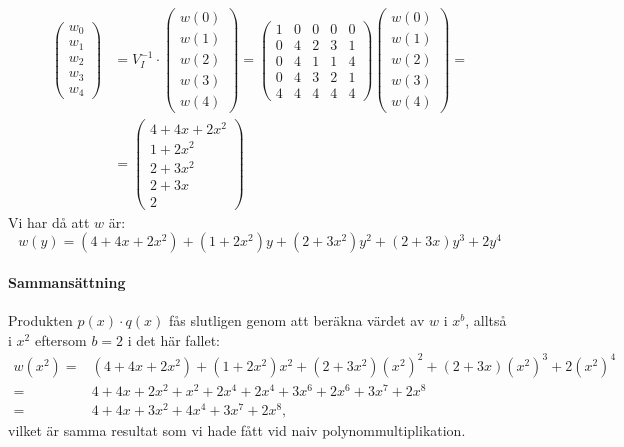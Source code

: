 \begin{align*}
  \begin{pmatrix}
    w_0 \\
    w_1 \\
    w_2 \\
    w_3 \\
    w_4
  \end{pmatrix} & =
  V_I^{-1} \cdot \begin{pmatrix}
    w(0) \\
    w(1) \\
    w(2) \\
    w(3) \\
    w(4)
  \end{pmatrix} =
  \begin{pmatrix}
    1 & 0 & 0 & 0 & 0 \\
    0 & 4 & 2 & 3 & 1 \\
    0 & 4 & 1 & 1 & 4 \\
    0 & 4 & 3 & 2 & 1 \\
    4 & 4 & 4 & 4 & 4
  \end{pmatrix}
  \begin{pmatrix}
    w(0) \\
    w(1) \\
    w(2) \\
    w(3) \\
    w(4)
  \end{pmatrix} = \\
  &= \begin{pmatrix}
    4 + 4x + 2x^2 \\
    1 + 2x^2 \\
    2 + 3x^2 \\
    2 + 3x \\
    2
  \end{pmatrix}
\end{align*}
Vi har då att $w$ är:
\begin{equation*}
  w(y) = (4 + 4x + 2x^2) + (1 + 2x^2)y + (2 + 3x^2)y^2 + (2 + 3x)y^3 + 2y^4
\end{equation*}

\paragraph{Sammansättning}
Produkten $p(x) \cdot q(x)$ fås slutligen genom att beräkna värdet av $w$ i
$x^b$, alltså i $x^2$ eftersom $b = 2$ i det här fallet:
\begin{align*}
  w(x^2) =& (4 + 4x + 2x^2) + (1 + 2x^2)x^2 + (2 + 3x^2)(x^2)^2 + (2 + 3x)(x^2)^3 + 2(x^2)^4 \\
         =& 4 + 4x + 2x^2 + x^2 + 2x^4 + 2x^4 + 3x^6 + 2x^6 + 3x^7 + 2x^8 \\
         =& 4 + 4x + 3x^2 + 4x^4 + 3x^7 + 2x^8,
\end{align*}
vilket är samma resultat som vi hade fått vid naiv polynommultiplikation.
